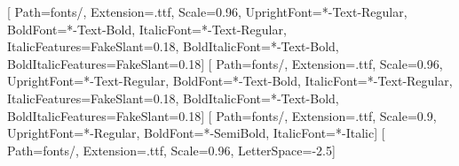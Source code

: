 \usepackage{xcolor}
\pagecolor{RavenPaper}
\AtBeginDocument{\color{RavenInk}}

%
\usepackage{fontspec}
\setmainfont{BricolageGrotesque}[
  Path=fonts/, Extension=.ttf, Scale=0.96,
  UprightFont=*-Text-Regular, BoldFont=*-Text-Bold,
  ItalicFont=*-Text-Regular, ItalicFeatures={FakeSlant=0.18},
  BoldItalicFont=*-Text-Bold, BoldItalicFeatures={FakeSlant=0.18}]
\setsansfont{BricolageGrotesque}[
  Path=fonts/, Extension=.ttf, Scale=0.96,
  UprightFont=*-Text-Regular, BoldFont=*-Text-Bold,
  ItalicFont=*-Text-Regular, ItalicFeatures={FakeSlant=0.18},
  BoldItalicFont=*-Text-Bold, BoldItalicFeatures={FakeSlant=0.18}]
\setmonofont{IBMPlexMono}[
  Path=fonts/, Extension=.ttf, Scale=0.9,
  UprightFont=*-Regular, BoldFont=*-SemiBold, ItalicFont=*-Italic]
\newfontfamily{}[
  Path=fonts/, Extension=.ttf, Scale=0.96, LetterSpace=-2.5]
\makeatletter
\DeclareRobustCommand\ttfamily{\not@math@alphabet\ttfamily\mathtt
  \fontfamily\ttdefault\selectfont\hyphenchar\font=\m@ne}
\makeatother

